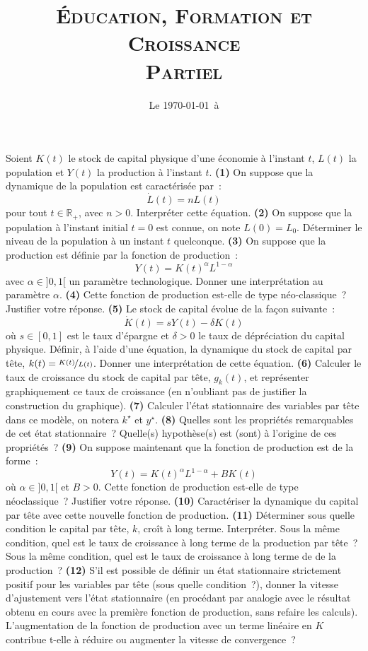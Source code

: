\documentclass[11pt,a4paper,notitlepage,twocolumn]{article}
\begin{document}
\title{\textsc{Éducation, Formation et Croissance\\ \small{Partiel}}}
\date{Le \today\ à \thistime}

\maketitle
\thispagestyle{empty}

Soient $K(t)$ le stock de capital physique d'une économie à l'instant
$t$, $L(t)$ la population et $Y(t)$ la production à l'instant $t$. \textbf{(1)} On suppose que la dynamique de la population est caractérisée par :
\[
\dot L(t) = n L(t)
\]
pour tout $t\in\mathbb R_+$, avec $n>0$. Interpréter cette équation. \textbf{(2)} On suppose que la population à l'instant initial $t=0$ est connue, on note $L(0) = L_0$. Déterminer le niveau de la population à un instant $t$ quelconque. \textbf{(3)} On suppose que la production est définie par la fonction de production :
\[
Y(t) = K(t)^{\alpha}L^{1-\alpha}
\]
avec $\alpha\in]0,1[$ un paramètre technologique. Donner une interprétation au paramètre $\alpha$. \textbf{(4)} Cette fonction de production est-elle de type néo-classique ? Justifier votre réponse. \textbf{(5)} Le stock de capital évolue de la façon suivante :
\[
\dot K(t) = sY(t)-\delta K(t)
\]
où $s\in[0,1]$ est le taux d'épargne et $\delta>0$ le taux de dépréciation du capital physique. Définir, à l'aide d'une équation, la dynamique du stock de capital par tête, $k(t)=\nicefrac{K(t)}{L(t)}$. Donner une interprétation de cette équation. \textbf{(6)} Calculer le taux de croissance du stock de capital par tête, $g_k(t)$, et représenter graphiquement ce taux de croissance (en n'oubliant pas de justifier la construction du graphique). \textbf{(7)} Calculer l'état stationnaire des variables par tête dans ce modèle, on notera $k^{\star}$ et $y^{\star}$. \textbf{(8)} Quelles sont les propriétés remarquables de cet état stationnaire ? Quelle(s) hypothèse(s) est (sont) à l'origine de ces propriétés ? \textbf{(9)} On suppose maintenant que la fonction de production est de la forme :
\[
Y(t) = K(t)^{\alpha}L^{1-\alpha} + BK(t)
\]
où $\alpha\in]0,1[$ et $B>0$. Cette fonction de production est-elle de type néoclassique ? Justifier votre réponse. \textbf{(10)} Caractériser la dynamique du capital par tête avec cette nouvelle fonction de production. \textbf{(11)} Déterminer sous quelle condition le capital par tête, $k$, croît à long terme. Interpréter. Sous la même condition, quel est le taux de croissance à long terme de la production par tête ? Sous la même condition, quel est le taux de croissance à long terme de de la production ? \textbf{(12)} S'il est possible de définir un état stationnaire strictement positif pour les variables par tête (sous quelle condition ?), donner la vitesse d'ajustement vers l'état stationnaire (en procédant par analogie avec le résultat obtenu en cours avec la première fonction de production, sans refaire les calculs). L'augmentation de la fonction de production avec un terme linéaire en $K$ contribue t-elle à réduire ou augmenter la vitesse de convergence ?
\end{document}
